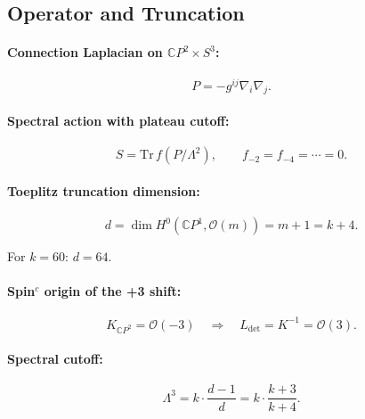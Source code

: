 \documentclass[11pt]{article}
\begin{document}
\subsection{Operator and Truncation}

\paragraph{Connection Laplacian on $\mathbb{C}P^2 \times S^3$:}
\begin{equation}\tag{CL-1}
P = -g^{ij}\nabla_i \nabla_j.
\end{equation}

\paragraph{Spectral action with plateau cutoff:}
\begin{equation}\tag{CL-2}
S = \mathrm{Tr}\,f(P/\Lambda^2), \qquad f_{-2} = f_{-4} = \cdots = 0.
\end{equation}

\paragraph{Toeplitz truncation dimension:}
\begin{equation}\tag{CL-3}
d = \dim H^0(\mathbb{C}P^1, \mathcal{O}(m)) = m + 1 = k + 4.
\end{equation}

For $k = 60$: $d = 64$.

\paragraph{Spin$^c$ origin of the +3 shift:}
\begin{equation}\tag{CL-4}
K_{\mathbb{C}P^2} = \mathcal{O}(-3) \quad\Rightarrow\quad L_{\det} = K^{-1} = \mathcal{O}(3).
\end{equation}

\paragraph{Spectral cutoff:}
\begin{equation}\tag{CL-5}
\Lambda^3 = k \cdot \frac{d-1}{d} = k \cdot \frac{k+3}{k+4}.
\end{equation}
\end{document}

